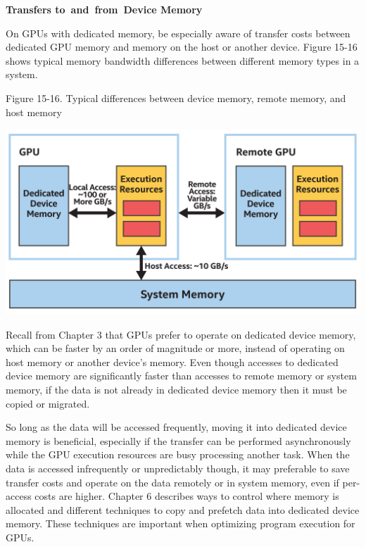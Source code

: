 \hspace*{\fill} \par %
\textbf{Transfers to and from Device Memory}

On GPUs with dedicated memory, be especially aware of transfer costs between dedicated GPU memory and memory on the host or another device. Figure 15-16 shows typical memory bandwidth differences between different memory types in a system.\par

\hspace*{\fill} \par %
Figure 15-16. Typical differences between device memory, remote memory, and host memory
\begin{center}
	\includegraphics[width=1.0\textwidth]{content/chapter-15/images/12}
\end{center}

Recall from Chapter 3 that GPUs prefer to operate on dedicated device memory, which can be faster by an order of magnitude or more, instead of operating on host memory or another device’s memory. Even though accesses to dedicated device memory are significantly faster than accesses to remote memory or system memory, if the data is not already in dedicated device memory then it must be copied or migrated.\par

So long as the data will be accessed frequently, moving it into dedicated device memory is beneficial, especially if the transfer can be performed asynchronously while the GPU execution resources are busy processing another task. When the data is accessed infrequently or unpredictably though, it may preferable to save transfer costs and operate on the data remotely or in system memory, even if per-access costs are higher. Chapter 6 describes ways to control where memory is allocated and different techniques to copy and prefetch data into dedicated device memory. These techniques are important when optimizing program execution for GPUs.\par








